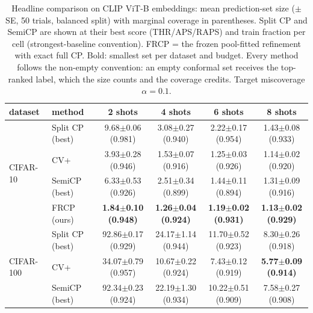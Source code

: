%   
%   
\begin{table}[t]
\centering
\small
\caption{Headline comparison on CLIP ViT-B embeddings: mean prediction-set size ($\pm$ SE, 50 trials, balanced split) with marginal coverage in parentheses. Split CP and SemiCP are shown at their best score (THR/APS/RAPS) and train fraction per cell (strongest-baseline convention). FRCP = the frozen pool-fitted refinement with exact full CP. Bold: smallest set per dataset and budget. Every method follows the non-empty convention: an empty conformal set receives the top-ranked label, which the size counts and the coverage credits. Target miscoverage $\alpha=0.1$.}
\label{tab:headline-clipb}
\begin{tabular}{llcccc}
\toprule
dataset & method & 2 shots & 4 shots & 6 shots & 8 shots\\
\midrule
\multirow{4}{*}{CIFAR-10} & Split CP (best) & 9.68$\pm$0.06 {\scriptsize(0.981)} & 3.08$\pm$0.27 {\scriptsize(0.940)} & 2.22$\pm$0.17 {\scriptsize(0.954)} & 1.43$\pm$0.08 {\scriptsize(0.933)}\\
 & CV+ & 3.93$\pm$0.28 {\scriptsize(0.946)} & 1.53$\pm$0.07 {\scriptsize(0.916)} & 1.25$\pm$0.03 {\scriptsize(0.926)} & 1.14$\pm$0.02 {\scriptsize(0.920)}\\
 & SemiCP (best) & 6.33$\pm$0.53 {\scriptsize(0.926)} & 2.51$\pm$0.34 {\scriptsize(0.899)} & 1.44$\pm$0.11 {\scriptsize(0.894)} & 1.31$\pm$0.09 {\scriptsize(0.916)}\\
 & FRCP (ours) & \textbf{1.84$\pm$0.10 {\scriptsize(0.948)}} & \textbf{1.26$\pm$0.04 {\scriptsize(0.924)}} & \textbf{1.19$\pm$0.02 {\scriptsize(0.931)}} & \textbf{1.13$\pm$0.02 {\scriptsize(0.929)}}\\
\midrule
\multirow{4}{*}{CIFAR-100} & Split CP (best) & 92.86$\pm$0.17 {\scriptsize(0.929)} & 24.17$\pm$1.14 {\scriptsize(0.944)} & 11.70$\pm$0.52 {\scriptsize(0.923)} & 8.30$\pm$0.26 {\scriptsize(0.918)}\\
 & CV+ & 34.07$\pm$0.79 {\scriptsize(0.957)} & 10.67$\pm$0.22 {\scriptsize(0.924)} & 7.43$\pm$0.12 {\scriptsize(0.919)} & \textbf{5.77$\pm$0.09 {\scriptsize(0.914)}}\\
 & SemiCP (best) & 92.34$\pm$0.23 {\scriptsize(0.924)} & 22.19$\pm$1.30 {\scriptsize(0.934)} & 10.22$\pm$0.51 {\scriptsize(0.909)} & 7.58$\pm$0.27 {\scriptsize(0.908)}\\

\end{tabular}
\end{table}
